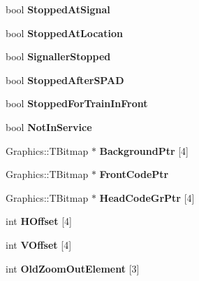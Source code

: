 \begin{DoxyCompactItemize}
bool {\bfseries Stopped\+At\+Signal}
\item 
\mbox{\label{class_t_train_a89642a602f382d5b58a7f5c0473f786f}} 
bool {\bfseries Stopped\+At\+Location}
\item 
\mbox{\label{class_t_train_ab04bbcf731ecc52b6549604d87101f63}} 
bool {\bfseries Signaller\+Stopped}
\item 
\mbox{\label{class_t_train_a9a333bca3d60db7670500574467ad7da}} 
bool {\bfseries Stopped\+After\+S\+P\+AD}
\item 
\mbox{\label{class_t_train_ae76e8f47258c0915f7f81e3b6596453c}} 
bool {\bfseries Stopped\+For\+Train\+In\+Front}
\item 
\mbox{\label{class_t_train_a92fca7c6fa30d8a5d5847b74e51e62cc}} 
bool {\bfseries Not\+In\+Service}
\item 
\mbox{\label{class_t_train_aaa4e520024a9e4c86e8754bb3c7cac2c}} 
Graphics\+::\+T\+Bitmap $\ast$ {\bfseries Background\+Ptr} \mbox{[}4\mbox{]}
\item 
\mbox{\label{class_t_train_a4ee3cdc7a3602f92a96084f8818b9bd3}} 
Graphics\+::\+T\+Bitmap $\ast$ {\bfseries Front\+Code\+Ptr}
\item 
\mbox{\label{class_t_train_ac19e1d8b5171bace341f951bac1031e1}} 
Graphics\+::\+T\+Bitmap $\ast$ {\bfseries Head\+Code\+Gr\+Ptr} \mbox{[}4\mbox{]}
\item 
\mbox{\label{class_t_train_a5b5409585a4af5224f1d91be6a405503}} 
int {\bfseries H\+Offset} \mbox{[}4\mbox{]}
\item 
\mbox{\label{class_t_train_a4c8b153a620229a3d9cc54f64ffa5f4a}} 
int {\bfseries V\+Offset} \mbox{[}4\mbox{]}
\item 
\mbox{\label{class_t_train_a29c7350be73eb11a6c018a4bc8f8099a}} 
int {\bfseries Old\+Zoom\+Out\+Element} \mbox{[}3\mbox{]}
\item 
\mbox{\label{class_t_train_ac711fc0e209da47a98fd40def880f119}} 

\end{DoxyCompactItemize}
